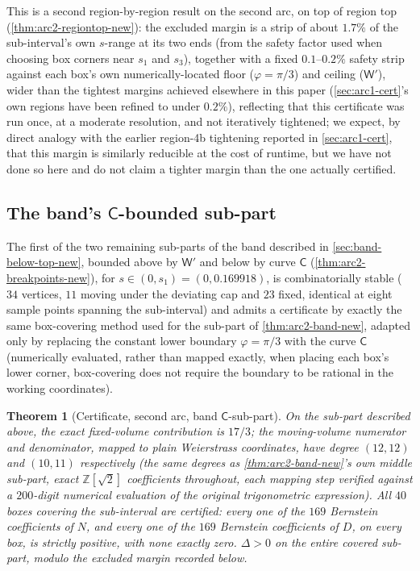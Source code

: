 \documentclass[11pt,reqno]{amsart}
\renewcommand{\_}{\origunderscore\allowbreak}
\numberwithin{equation}{section}
\theoremstyle{plain}
\newtheorem{thm}{Theorem}[section]
\theoremstyle{definition}
\theoremstyle{remark}
\newcommand{\tilt}{\varphi}                  %
\newcommand{\arcp}{s}                        %
\newcommand{\defect}{\Delta}                 %
\begin{document}
This is a second region-by-region result on the second arc, on
top of region top (\cref{thm:arc2-regiontop-new}): the excluded margin
is a strip of about $1.7\%$ of the sub-interval's own $\arcp$-range at
its two ends (from the safety factor used when choosing box corners
near $\arcp_1$ and $\arcp_3$), together with a fixed $0.1$--$0.2\%$
safety strip against each box's own numerically-located floor
($\tilt=\pi/3$) and ceiling ($\mathsf W'$), wider than the tightest
margins achieved elsewhere in this paper (\cref{sec:arc1-cert}'s own
regions have been refined to under $0.2\%$), reflecting that this
certificate was run once, at a moderate resolution, and not iteratively tightened; we expect, by direct analogy with the earlier
region-4b tightening reported in \cref{sec:arc1-cert}, that this margin
is similarly reducible at the cost of runtime, but we have not done so
here and do not claim a tighter margin than the one actually
certified.

\subsection{The band's \texorpdfstring{$\mathsf C$}{C}-bounded sub-part}\label{sec:arc2-bandC-new}

The first of the two remaining sub-parts of the band described in
\cref{sec:band-below-top-new}, bounded above by $\mathsf W'$ and below
by curve $\mathsf C$ (\cref{thm:arc2-breakpoints-new}), for
$\arcp\in(0,\arcp_1)=(0,0.169918)$, is combinatorially stable ($34$
vertices, $11$ moving under the deviating cap and $23$ fixed,
identical at eight sample points spanning the sub-interval) and admits
a certificate by exactly the same box-covering method used for the
sub-part of \cref{thm:arc2-band-new}, adapted only by replacing the
constant lower boundary $\tilt=\pi/3$ with the curve $\mathsf C$
(numerically evaluated, rather than mapped exactly, when placing each
box's lower corner, box-covering does not require the boundary to be
rational in the working coordinates).

\begin{thm}[Certificate, second arc, band \texorpdfstring{$\mathsf C$}{C}-sub-part]\label{thm:arc2-bandC-new}
On the sub-part described above, the exact fixed-volume contribution is
$17/3$; the moving-volume numerator and denominator, mapped to plain
Weierstrass coordinates, have degree $(12,12)$ and $(10,11)$
respectively (the same degrees as \cref{thm:arc2-band-new}'s own
middle sub-part, exact $\mathbb{Z}[\sqrt2]$ coefficients throughout,
each mapping step verified against a $200$-digit numerical evaluation
of the original trigonometric expression). All $40$ boxes covering the
sub-interval are certified: every one of the $169$ Bernstein
coefficients of $N$, and every one of the $169$ Bernstein coefficients
of $D$, on every box, is strictly positive, with none exactly zero.
$\defect>0$ on the entire covered sub-part, modulo the excluded margin
recorded below.
\end{thm}
\end{document}
